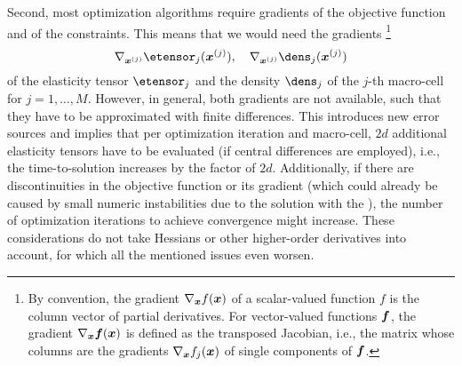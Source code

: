 Second, most optimization algorithms require gradients of the
objective function and of the constraints.
This means that we would need the gradients%
\footnote{%
  By convention, the gradient $\nabla_{{\boldsymbol{x}}} f({\boldsymbol{x}})$ of a
  scalar-valued function $f$ is the column vector of partial derivatives.
  For vector-valued functions ${\boldsymbol{f}}$, the gradient $\nabla_{{\boldsymbol{x}}} {\boldsymbol{f}}({\boldsymbol{x}})$
  is defined as the transposed Jacobian, i.e., the matrix whose columns
  are the gradients $\nabla_{{\boldsymbol{x}}} f_j({\boldsymbol{x}})$ of single components of
  ${\boldsymbol{f}}$.%
}
\begin{equation}
  \nabla_{\*x^{(j)}} \etensor_j(\*x^{(j)}),\quad
  \nabla_{\*x^{(j)}} \dens_j(\*x^{(j)})
\end{equation}
of the elasticity tensor $\etensor_j$ and
the density $\dens_j$ of the $j$-th macro-cell for $j = 1, \dotsc, M$.
However, in general, both gradients are not available,
such that they have to be approximated with finite differences.
This introduces new error sources and implies that
per optimization iteration and macro-cell,
$2d$ additional elasticity tensors have to be evaluated
(if central differences are employed), i.e.,
the time-to-solution increases by the factor of $2d$.
Additionally, if there are discontinuities in the objective function
or its gradient (which could already be caused by small numeric instabilities
due to the solution with the \fem),
the number of optimization iterations to achieve convergence might
increase.
These considerations do not take Hessians or other higher-order derivatives
into account, for which all the mentioned issues even worsen.

\blindtext{}















































